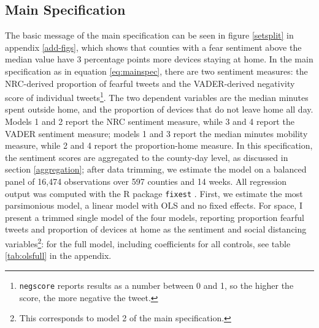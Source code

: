 \documentclass[12pt,a4]{article}
\begin{document}
\subsection{Main Specification}
The basic message of the main specification can be seen in figure \ref{setsplit} in appendix \ref{add-figs}, which shows that counties with a fear sentiment above the median value have 3 percentage points more devices staying at home. In the main specification as in equation \ref{eq:mainspec}, there are two sentiment measures: the NRC-derived proportion of fearful tweets and the VADER-derived negativity score of individual tweets\footnote{\texttt{negscore} reports results as a number between 0 and 1, so the higher the score, the more negative the tweet.}. The two dependent variables are the median minutes spent outside home, and the proportion of devices that do not leave home all day. Models 1 and 2 report the NRC sentiment measure, while 3 and 4 report the VADER sentiment measure; models 1 and 3 report the median minutes mobility measure, while 2 and 4 report the proportion-home measure. In this specification, the sentiment scores are aggregated to the county-day level, as discussed in section \ref{aggregation}; after data trimming, we estimate the model on a balanced panel of 16,474 observations over 597 counties and 14 weeks. All regression output was computed with the R package \texttt{fixest} \parencite{bergeEfficientEstimationMaximum2018}. First, we estimate the most parsimonious model, a linear model with OLS and no fixed effects. For space, I present a trimmed single model of the four models, reporting proportion fearful tweets and proportion of devices at home as the sentiment and social distancing variables\footnote{This corresponds to model 2 of the main specification.}: for the full model, including coefficients for all controls, see table \ref{tab:olsfull} in the appendix.
\end{document}
